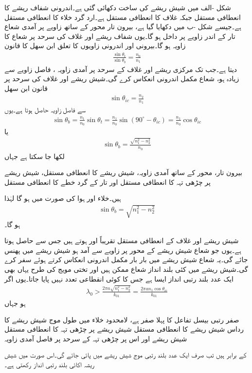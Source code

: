 شکل -الف میں شیش ریشے کی ساخت دکھائی گئی ہے۔اندرونی شفاف ریشے کا  انعطافی مستقل  جبکہ غلاف کا  انعطافی مستقل  ہے۔ارد گرد خلاء کا  انعطافی مستقل  ہے۔جیسے شکل -ب میں دکھایا گیا ہے، بیرون تار محور کے ساتھ  زاویے پر آمدی شعاع تار کے اندر  زاویے پر داخل ہو گا۔یوں شفاف ریشے اور غلاف کی سرحد پر شعاع کا زاویہ  ہو گا۔بیرونی اور اندرونی زاویوں کا تعلق ابن سھل کا قانون
\begin{align}
\frac{\sin \theta_t}{\sin \theta_b}=\frac{n_0}{n_1}
\end{align}
دیتا ہے۔جب تک مرکزی ریشے اور غلاف کے سرحد پر آمدی زاویہ ، فاصل زاویے  سے زیادہ ہو، شعاع مکمل اندرونی انعکاس کرے گی۔شیش ریشے اور غلاف کی سرحد پر قانون ابن سھل
\begin{align}
\sin{\theta_{ic}}=\frac{n_2}{n_1}
\end{align}
 سے فاصل زاویہ  حاصل ہوتا ہے۔یوں
\begin{align*}
\sin \theta_b=\frac{n_1}{n_0} \sin \theta_t =\frac{n_1}{n_0} \sin(90^{\circ}-\theta_{ic})=\frac{n_1}{n_0} \cos \theta_{ic}
\end{align*}
یا
\begin{align}
\sin \theta_b=\frac{\sqrt{n_1^2-n_2^2}}{n_0}
\end{align}
لکھا جا سکتا ہے جہاں
\begin{description}
 بیرون تار، محور کے ساتھ آمدی زاویہ،
 شیش ریشے کا  انعطافی مستقل،
 شیش ریشے پر چڑھی تہہ کا  انعطافی مستقل اور
 تار کے گرد خطے کا  انعطافی مستقل
\end{description}
ہیں۔خلاء اور ہوا کی صورت میں  ہو گا لہٰذا
\begin{align}
\sin \theta_b=\sqrt{n_1^2-n_2^2}
\end{align}
ہو گا۔

شیش ریشے اور غلاف کے  انعطافی مستقل تقریباً  اور  ہوتے ہیں جس سے  حاصل ہوتا ہے۔یوں جو شعاع شیش ریشے کے محور پر  زاویے سے آمد ہو شیش ریشے میں پھنس جائے گی۔یہ شعاع شیش ریشے میں بار بار مکمل اندرونی انعکاس کرتے ہوئے سفر کرے گی۔شیش ریشے میں کئی بلند انداز شعاع ممکن ہیں اور تختی مویج کی طرح یہاں بھی ایک عدد بلند رتبی انداز ایسا ہے جس کا کوئی انقطاعی تعدد نہیں پایا جاتا۔یوں اگر
\begin{align}
\lambda_0>\frac{2\pi a \sqrt{n_1^2-n_2^2}}{k_{01}}=\frac{2\pi a n_1 \cos \theta_{ic}}{k_{01}}
\end{align}
ہو جہاں
\begin{description}
 صفر رتبی بیسل تفاعل  کا پہلا صفر  ہے،
 لامحدود خلاء میں طول موج
 شیش ریشے کا رداس
 شیش ریشے کا  انعطافی مستقل
 شیش ریشے پر چڑھی تہہ کا  انعطافی مستقل
 شیش ریشے اور اس پر چڑھی تہہ کے سرحد پر فاصل آمدی زاویہ
\end{description}
کے برابر ہیں تب صرف ایک عدد بلند رتبی موج شیش ریشے میں پائی جائے گی۔اس صورت میں شیش ریشہ اکائی بلند رتبی انداز رکھتی ہے۔

